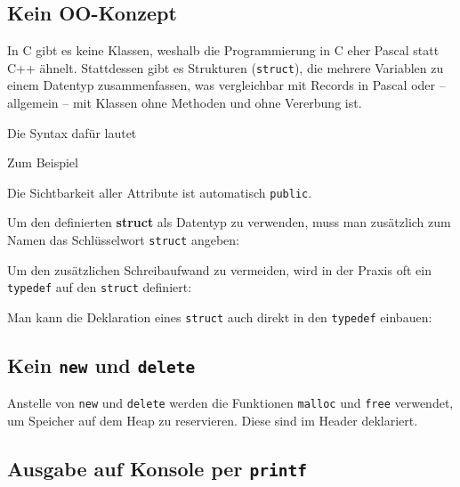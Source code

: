 \subsection{Kein OO-Konzept}
In C gibt es keine Klassen, weshalb die Programmierung in C eher Pascal statt C++ ähnelt.
Stattdessen gibt es Strukturen (\lstinline{struct}), die mehrere Variablen zu einem Datentyp zusammenfassen, was vergleichbar mit Records in Pascal oder -- allgemein -- mit Klassen ohne Methoden und ohne Vererbung ist.

Die Syntax dafür lautet



Zum Beispiel



Die Sichtbarkeit aller Attribute ist automatisch \lstinline{public}.

Um den definierten \textbf{struct} als Datentyp zu verwenden, muss man zusätzlich zum Namen das Schlüsselwort \lstinline{struct} angeben:



Um den zusätzlichen Schreibaufwand zu vermeiden, wird in der Praxis oft ein \lstinline{typedef} auf den \lstinline{struct} definiert:



Man kann die Deklaration eines \lstinline{struct} auch direkt in den \lstinline{typedef} einbauen:



\subsection{Kein \lstinline{new} und \lstinline{delete}}

Anstelle von \lstinline{new} und \lstinline{delete} werden die Funktionen \lstinline{malloc} und \lstinline{free} verwendet, um Speicher auf dem Heap zu reservieren.
Diese sind im Header  deklariert.



\subsection{Ausgabe auf Konsole per \lstinline{printf}}

